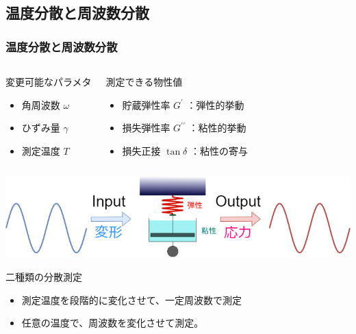 \documentclass[unicode,12pt]{beamer}%
\begin{document}
\subsection{温度分散と周波数分散}
\begin{frame}
	\frametitle{温度分散と周波数分散}
		\vspace{-5mm}
	\begin{columns}[T, onlytextwidth]
			\begin{exampleblock}{変更可能なパラメタ}
				\begin{itemize}
				\item 角周波数 $\omega$
				\item ひずみ量 $\gamma$
				\item 測定温度 $T$
				\end{itemize}
			\end{exampleblock}
			\begin{block}{測定できる物性値}
				\begin{itemize}
				\item 貯蔵弾性率 $G^{\prime}$ ：弾性的挙動
				\item 損失弾性率 $G^{\prime \prime}$ ：粘性的挙動
				\item 損失正接 $\tan \delta$ ：粘性の寄与
				\end{itemize}
			\end{block}
	\end{columns}

		\vspace{3mm}
			\centering
				\includegraphics[width=.9\textwidth]{dynamic_ViscoElast_2.png}
		
	\begin{alertblock}{二種類の分散測定}
		\begin{itemize}
			\item 測定温度を段階的に変化させて、一定周波数で測定
			\item 任意の温度で、周波数を変化させて測定。
		\end{itemize}
	\end{alertblock}
\end{frame}
\end{document}
